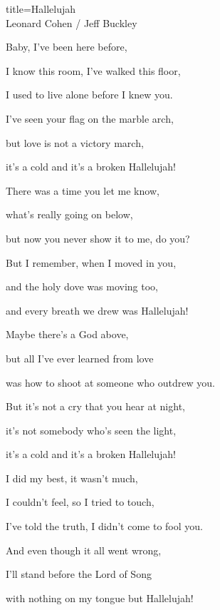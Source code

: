 \begin{song}{title=\centering Hallelujah \\\normalsize Leonard Cohen / Jeff Buckley \vspace*{-0.3cm}}
{\begin{minipage}[t]{0.48\textwidth}
\sloka
	Baby, I've been here before,  
	
	I know this room, I've walked this floor,  
	
	I used to live alone before I knew you.  
	
	I've seen your flag on the marble arch,  
	
	but love is not a victory march,  
	
	it's a cold and it's a broken Hallelujah!  


\end{minipage}\begin{minipage}[t]{0.48\textwidth}\setlength{\parindent}{0.45cm}  %
\vspace*{0.5cm}

\sloka
	There was a time you let me know,   
	
	what's really going on below,   
	
	but now you never show it to me, do you?   
	
	But I remember, when I moved in you,   
	
	and the holy dove was moving too,   
	
	and every breath we drew was Hallelujah!   
	

\sloka
	Maybe there's a God above,   
	
	but all I've ever learned from love   
	
	was how to shoot at someone who outdrew you.   
	
	But it's not a cry that you hear at night,   
	
	it's not somebody who's seen the light,   
	
	it's a cold and it's a broken Hallelujah!   
	
\sloka
	I did my best, it wasn't much,   
	
	I couldn't feel, so I tried to touch,   
	
	I've told the truth, I didn't come to fool you.   
	
	And even though it all went wrong,   
	
	I'll stand before the Lord of Song   
	
	with nothing on my tongue but Hallelujah!   
	


\end{minipage}   %
}
\setcounter{Slokočet}{0}
\end{song}


